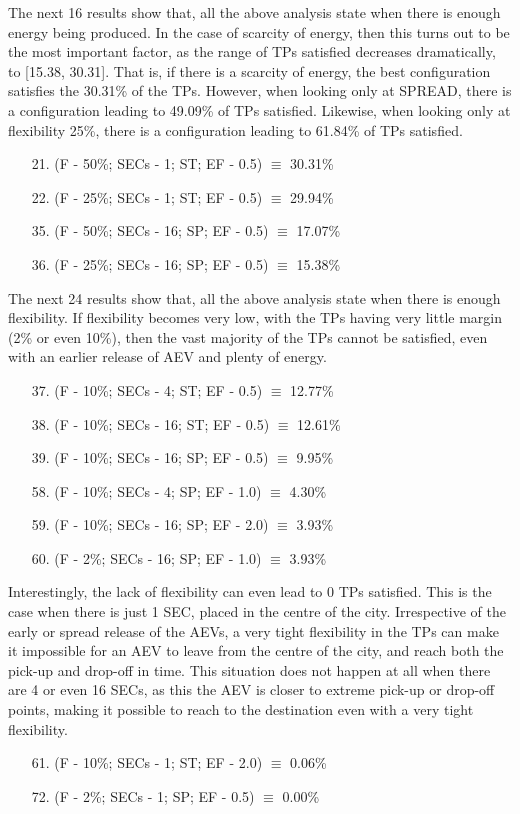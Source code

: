The next 16 results show that, all the above analysis state when there is enough energy being produced.
In the case of scarcity of energy, then this turns out to be the most important factor, as the range of TPs satisfied decreases dramatically, to [15.38, 30.31].
That is, if there is a scarcity of energy, the best configuration satisfies the 30.31\% of the TPs.
However, when looking only at SPREAD, there is a configuration leading to 49.09\% of TPs satisfied.
Likewise, when looking only at flexibility 25\%, there is a configuration leading to 61.84\% of TPs satisfied.
\begin{enumerate}
\item[21.] (F - 50\%; SECs - 1; ST; EF - 0.5) $\equiv$ 30.31\%
\item[22.] (F - 25\%; SECs - 1; ST; EF - 0.5) $\equiv$ 29.94\%
\item[35.] (F - 50\%; SECs - 16; SP; EF - 0.5) $\equiv$ 17.07\%
\item[36.] (F - 25\%; SECs - 16; SP; EF - 0.5) $\equiv$ 15.38\% 
\end{enumerate}
The next 24 results show that, all the above analysis state when there is enough flexibility.
If flexibility becomes very low, with the TPs having very little margin (2\% or even 10\%), then the vast majority of the TPs cannot be satisfied, even with an earlier release of AEV and plenty of energy.
\begin{enumerate}
\item[37.] (F - 10\%; SECs - 4; ST; EF - 0.5) $\equiv$ 12.77\%
\item[38.] (F - 10\%; SECs - 16; ST; EF - 0.5) $\equiv$ 12.61\%
\item[39.] (F - 10\%; SECs - 16; SP; EF - 0.5) $\equiv$ 9.95\%
\item[58.] (F - 10\%; SECs - 4; SP; EF - 1.0) $\equiv$ 4.30\% 
\item[59.] (F - 10\%; SECs - 16; SP; EF - 2.0) $\equiv$ 3.93\%
\item[60.] (F - 2\%; SECs - 16; SP; EF - 1.0) $\equiv$ 3.93\%
\end{enumerate}

Interestingly, the lack of flexibility can even lead to 0 TPs satisfied. This is the case when there is just 1 SEC, placed in the centre of the city. Irrespective of the early or spread release of the AEVs, a very tight flexibility in the TPs can make it impossible for an AEV to leave from the centre of the city, and reach both the pick-up and drop-off in time. This situation does not happen at all when there are 4 or even 16 SECs, as this the AEV is closer to extreme pick-up or drop-off points, making it possible to reach to the destination even with a very tight flexibility.
\begin{enumerate}
\item[61.] (F - 10\%; SECs - 1; ST; EF - 2.0) $\equiv$ 0.06\%
\item[72.] (F - 2\%; SECs - 1; SP; EF - 0.5) $\equiv$ 0.00\%
\end{enumerate}

